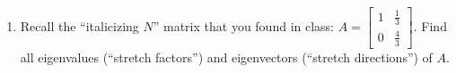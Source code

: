 \documentclass[letter]{article}
\newcommand{\R}{\mathbb{R}}
\newcommand{\mat}[1]{\begin{bmatrix}#1\end{bmatrix}}
\begin{document}
\begin{enumerate}
		
		\item Recall the ``italicizing $N$'' matrix that you found in class: $A = \mat{1 & \frac{1}{3} \\ 0 & \frac{4}{3}}$.
		Find all eigenvalues (``stretch factors'') and eigenvectors (``stretch directions'') of $A$.
		
			
		
		
			
		
	\end{enumerate}
\end{document}
